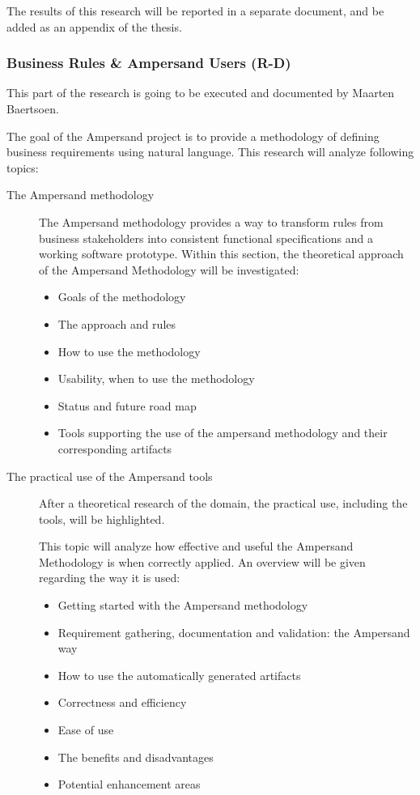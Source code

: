 \noindent
The results of this research will be reported in a separate document, and be added as an appendix of the thesis.

\subsubsection{Business Rules \& Ampersand Users (R-D)}
This part of the research is going to be executed and documented by Maarten Baertsoen.

The goal of the Ampersand project is to provide a methodology of defining business requirements using natural language.
This research will analyze following topics:

\begin{description}
	\item [The Ampersand methodology ]
	The Ampersand methodology provides a way to transform rules from business stakeholders into consistent functional specifications and a working software prototype.
	Within this section, the theoretical approach of the Ampersand Methodology will be investigated:
	\begin{itemize}
		\item Goals of the methodology
		\item The approach and rules
		\item How to use the methodology
		\item Usability, when to use the methodology
		\item Status and future road map
		\item Tools supporting the use of the ampersand methodology and their corresponding artifacts
	\end{itemize}
	
	\item [The practical use of the Ampersand tools]
	After a theoretical research of the domain, the practical use, including the tools, will be highlighted.
	
	This topic will analyze how effective and useful the Ampersand Methodology is when correctly applied.
	An overview will be given regarding the way it is used:
	\begin{itemize}
		\item Getting started with the Ampersand methodology
		\item Requirement gathering, documentation and validation: the Ampersand way
		\item How to use the automatically generated artifacts
		\item Correctness and efficiency
		\item Ease of use
		\item The benefits and disadvantages
		\item Potential enhancement areas
	\end{itemize}
	
\end{description}

